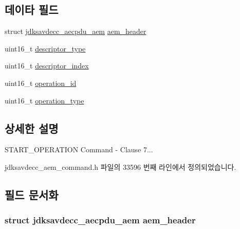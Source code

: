 \subsection*{데이타 필드}
\begin{DoxyCompactItemize}
\item 
struct \hyperlink{structjdksavdecc__aecpdu__aem}{jdksavdecc\+\_\+aecpdu\+\_\+aem} \hyperlink{structjdksavdecc__aem__command__start__operation_ae1e77ccb75ff5021ad923221eab38294}{aem\+\_\+header}
\item 
uint16\+\_\+t \hyperlink{structjdksavdecc__aem__command__start__operation_ab7c32b6c7131c13d4ea3b7ee2f09b78d}{descriptor\+\_\+type}
\item 
uint16\+\_\+t \hyperlink{structjdksavdecc__aem__command__start__operation_a042bbc76d835b82d27c1932431ee38d4}{descriptor\+\_\+index}
\item 
uint16\+\_\+t \hyperlink{structjdksavdecc__aem__command__start__operation_a5b1b19c38a3b340cfc6ebcb9eeb153e2}{operation\+\_\+id}
\item 
uint16\+\_\+t \hyperlink{structjdksavdecc__aem__command__start__operation_ab2dfcd06646c4907feb4ec8153ba7b79}{operation\+\_\+type}
\end{DoxyCompactItemize}


\subsection{상세한 설명}
S\+T\+A\+R\+T\+\_\+\+O\+P\+E\+R\+A\+T\+I\+ON Command -\/ Clause 7... 

jdksavdecc\+\_\+aem\+\_\+command.\+h 파일의 33596 번째 라인에서 정의되었습니다.



\subsection{필드 문서화}
\subsubsection[{\texorpdfstring{aem\+\_\+header}{aem_header}}]{\setlength{\rightskip}{0pt plus 5cm}struct {\bf jdksavdecc\+\_\+aecpdu\+\_\+aem} aem\+\_\+header}\hypertarget{structjdksavdecc__aem__command__start__operation_ae1e77ccb75ff5021ad923221eab38294}{}\label{structjdksavdecc__aem__command__start__operation_ae1e77ccb75ff5021ad923221eab38294}


